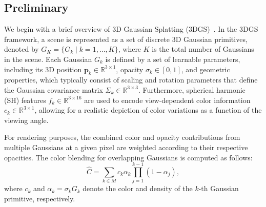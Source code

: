 \subsection{Preliminary}
\label{3.1}
We begin with a brief overview of 3D Gaussian Splatting (3DGS)~\cite{3dgs}. 
In the 3DGS framework, a scene is represented as a set of discrete 3D Gaussian primitives, denoted by \( G_K = \{ G_k \mid k = 1, \dots, K \} \), where \( K \) is the total number of Gaussians in the scene. 
Each Gaussian \( G_k \) is defined by a set of learnable parameters, including its 3D position \( \mathbf{p}_k \in \mathbb{R}^{3 \times 1} \), opacity \( \sigma_k \in [0, 1] \), and geometric properties, which typically consist of scaling and rotation parameters that define the Gaussian covariance matrix \( \Sigma_k \in \mathbb{R}^{3 \times 3} \). %
Furthermore, spherical harmonic (SH) features \( f_k \in \mathbb{R}^{3 \times 16} \) are used to encode view-dependent color information \( c_k \in \mathbb{R}^{3 \times 1} \), allowing for a realistic depiction of color variations as a function of the viewing angle.

For rendering purposes, the combined color and opacity contributions from multiple Gaussians at a given pixel are weighted according to their respective opacities. The color blending for overlapping Gaussians is computed as follows:
\begin{equation}
\hat{C} = \sum_{k \in M} c_k \alpha_k \prod_{j=1}^{k-1} \left( 1 - \alpha_j \right),
\label{eq1}
\end{equation}
where \( c_k \) and \( \alpha_k = \sigma_kG_k \) denote the color and density of the \( k \)-th Gaussian primitive, respectively.


